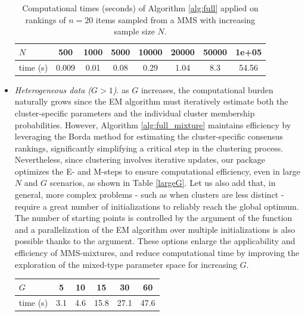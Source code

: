 \begin{itemize}
\begin{table}[h!]
\centering
\begin{tabular}{|llllllll}\hline
$N$ &
  \multicolumn{1}{|c|}{500} &
  \multicolumn{1}{|c|}{1000} &
  \multicolumn{1}{|c|}{5000} &
  \multicolumn{1}{|c|}{10000} &
  \multicolumn{1}{|c|}{20000} &
  \multicolumn{1}{|c|}{50000} &
  \multicolumn{1}{|c|}{1e+05} \\\hline
time (s) &
  \multicolumn{1}{|c|}{0.009} &
  \multicolumn{1}{|c|}{0.01} &
  \multicolumn{1}{|c|}{0.08} &
  \multicolumn{1}{|c|}{0.29} &
  \multicolumn{1}{|c|}{1.04} &
  \multicolumn{1}{|c|}{8.3} &
  \multicolumn{1}{|c|}{54.56} \\\hline
\end{tabular}
\caption{Computational times (seconds) of Algorithm \ref{alg:full} applied on rankings of $n=20$ items sampled from a MMS with increasing sample size $N$.}
\label{largeN}
\end{table}
\item \textit{Heterogeneous data ($G > 1$)}. as $G$ increases, the computational burden naturally grows since the EM algorithm must iteratively estimate both the cluster-specific parameters and the individual cluster membership probabilities. 
However, Algorithm \ref{alg:full_mixture} maintains efficiency by leveraging the Borda method for estimating the cluster-specific consensus rankings, significantly simplifying a critical step in the clustering process.
Nevertheless, since clustering involves iterative updates, our package optimizes the E- and M-steps to ensure computational efficiency, even in large $N$ and $G$ scenarios, as shown in Table \ref{largeG}. Let us also add that, in general, more complex problems - such as when clusters are less distinct - require a great number of initializations  to reliably reach the global optimum. The number of starting points is controlled by the argument  of the  function and a parallelization of the EM algorithm over multiple initializations is also possible thanks to the  argument. These options enlarge the applicability and efficiency of MMS-mixtures, and reduce computational time by improving the exploration of the mixed-type parameter space for increasing $G$.
\begin{table}[h]
\centering
\begin{tabular}{|l|c|c|c|c|c|}
\hline
$G$        & 5   & 10  & 15   & 30   & 60   \\ \hline
time (s) & 3.1 & 4.6 & 15.8 & 27.1 & 47.6 \\ \hline

\end{tabular}
\end{table}
\end{itemize}
